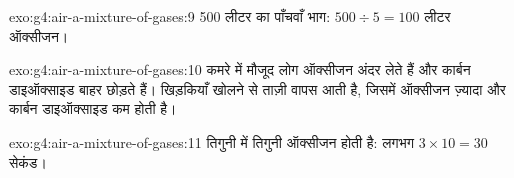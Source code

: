 \begin{solution}{exo:g4:air-a-mixture-of-gases:9}
500 लीटर का पाँचवाँ भाग: $500 \div 5 = 100$ लीटर ऑक्सीजन।
\end{solution}

\begin{solution}{exo:g4:air-a-mixture-of-gases:10}
कमरे में मौजूद लोग ऑक्सीजन अंदर लेते हैं और कार्बन डाइऑक्साइड बाहर छोड़ते
हैं। खिड़कियाँ खोलने से ताज़ी  वापस आती है, जिसमें ऑक्सीजन ज़्यादा और
कार्बन डाइऑक्साइड कम होती है।
\end{solution}

\begin{solution}{exo:g4:air-a-mixture-of-gases:11}
तिगुनी  में तिगुनी ऑक्सीजन होती है: लगभग
$3 \times 10 = 30$ सेकंड।
\end{solution}
